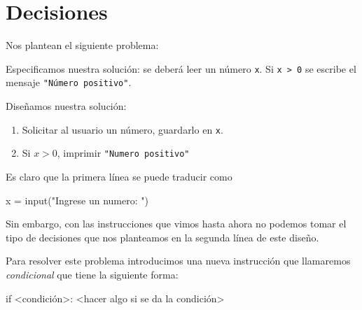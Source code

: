
%

\chapter{Decisiones}

Nos plantean el siguiente problema:

\begin{solucion}
Especificamos nuestra solución: se deberá leer un número \lstinline!x!.
Si \lstinline!x > 0! se escribe el mensaje \lstinline!"Número positivo"!.

Diseñamos nuestra solución:

\begin{enumerate}
\item Solicitar al usuario un número, guardarlo en \lstinline!x!.
\item Si $x>0$, imprimir \lstinline!"Numero positivo"!
\end{enumerate}

Es claro que la primera línea se puede traducir como
\begin{codigo-python-sn}
       x = input("Ingrese un numero: ")
\end{codigo-python-sn}

Sin embargo, con las instrucciones que vimos hasta ahora no podemos tomar
el tipo de decisiones que nos planteamos en la segunda línea de este
diseño.
\end{solucion}

Para resolver este problema introducimos una nueva instrucción que
llamaremos {\it condicional} que tiene la siguiente forma:

\begin{codigo-python-sn}
if <condición>:
    <hacer algo si se da la condición>
\end{codigo-python-sn}

